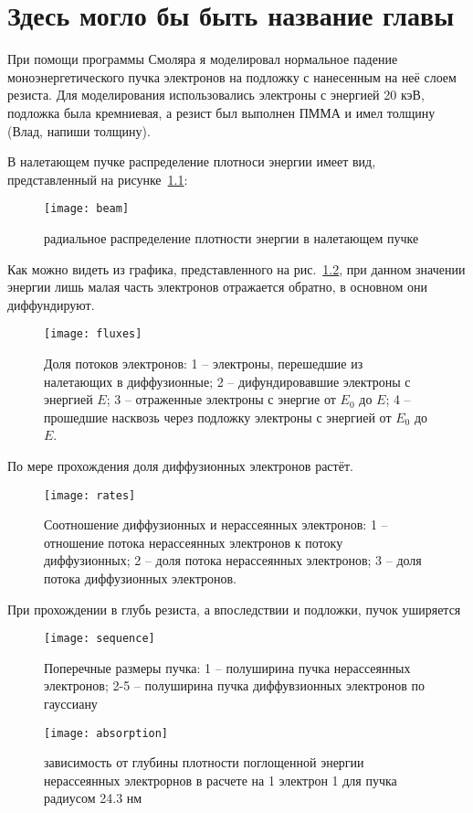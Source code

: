 \chapter{Здесь могло бы быть название главы}
При помощи программы Смоляра я моделировал нормальное падение моноэнергетического пучка электронов на подложку с нанесенным на неё слоем резиста. Для моделирования использовались электроны с энергией 20 кэВ, подложка была кремниевая, а резист был выполнен ПММА и имел толщину (Влад, напиши толщину).


В налетающем пучке распределение плотноси энергии имеет вид, представленный на рисунке~\ref{fig:beam}:
\begin{figure}[h]
    \center
    \texttt{[image: beam]}
    \caption{радиальное распределение плотности энергии в налетающем пучке}
    \label{fig:beam}
\end{figure}

Как можно видеть из графика, представленного на рис.~\ref{fig:fluxes}, при данном значении энергии лишь малая часть электронов отражается обратно, в основном они диффундируют.
\begin{figure}[h]
    \center
    \texttt{[image: fluxes]}
    \caption{Доля потоков электронов:
    1 -- электроны, перешедшие из налетающих в диффузионные;
2 -- дифундировавшие электроны с энергией $E$;
3 -- отраженные электроны с энергие от $E_0$ до $E$;
4 -- прошедшие насквозь через подложку электроны с энергией от $E_0$ до $E$.
}
    \label{fig:fluxes}
\end{figure}


По мере прохождения доля диффузионных электронов растёт.

\begin{figure}[h]
    \center
    \texttt{[image: rates]}
    \caption{Соотношение диффузионных и нерассеянных электронов: 1 -- отношение потока нерассеянных электронов к потоку диффузионных;
2 -- доля потока нерассеянных электронов;
3 -- доля потока диффузионных электронов.
}
    \label{fig:rates}
\end{figure}

При прохождении в глубь резиста, а впоследствии и подложки, пучок уширяется
\begin{figure}[h]
    \center
    \texttt{[image: sequence]}
    \caption{Поперечные размеры пучка:
1 -- полуширина пучка нерассеянных электронов;
2-5 -- полуширина пучка диффувзионных электронов по гауссиану}
    \label{fig:sequence}
\end{figure}


\begin{figure}[h]
    \center
    \texttt{[image: absorption]}
    \caption{зависимость от глубины плотности поглощенной энергии нерассеянных электрорнов в расчете на 1 электрон 1 для пучка радиусом 24.3 нм}
    \label{fig:absorption}
\end{figure}
